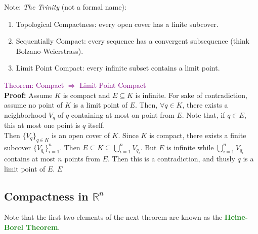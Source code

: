 \documentclass{article}
\begin{document}
Note: \textit{The Trinity} (not a formal name):

\begin{center}
\end{center}

\begin{enumerate}
    \item Topological Compactness: every open cover has a finite subcover.
    \item Sequentially Compact: every sequence has a convergent subsequence (think Bolzano-Weierstrass).
    \item Limit Point Compact: every infinite subset contains a limit point.
\end{enumerate}


\textcolor{Purple}{Theorem: Compact $\Longrightarrow$ Limit Point Compact}\\

\textbf{Proof:} Assume $K$ is compact and $E \subseteq K$ is infinite. For sake of contradiction, assume no point of $K$ is a limit point of $E$. Then, $\forall q \in K$, there exists a neighborhood $V_q$ of $q$ containing at most on point from $E$. Note that, if $q \in E$, this at most one point is $q$ itself. \\
Then $\{V_q\}_{q \in K}$ is an open cover of $K$. Since $K$ is compact, there exists a finite subcover $\{V_{q_i}\}_{i = 1}^n$. Then $E \subseteq K \subseteq \bigcup_{i=1}^nV_{q_i}$. But $E$ is infinite while $\bigcup_{i=1}^nV_{q_i}$ contains at most $n$ points from $E$. Then this is a contradiction, and thusly $q$ is a limit point of $E$.
$E$

\newpage

\subsection{Compactness in $\mathbb{R}^n$}

Note that the first two elements of the next theorem are known as the \textbf{\textcolor{ForestGreen}{Heine-Borel Theorem}}.
\end{document}
